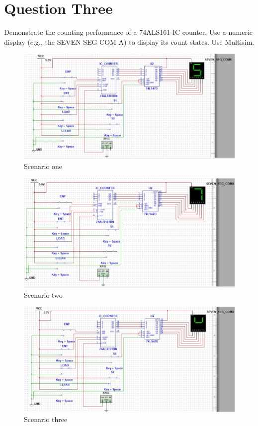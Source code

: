 \documentclass[a4paper,12]{article}
\begin{document}
\newpage
\section{Question Three}
Demonstrate the counting performance of a 74ALS161 IC counter. Use a numeric display (e.g., the SEVEN SEG COM A) to display its count states. Use Multisim.
\begin{figure}[H]
    \centering
    \includegraphics[width=\textwidth]{n31.jpg}
    \caption{Scenario one}
    \label{fig:1ae}
\end{figure}
\begin{figure}[H]
    \centering
    \includegraphics[width=\textwidth]{n32.jpg}
    \caption{Scenario two}
    \label{fig:1ae}
\end{figure}
\begin{figure}[H]
    \centering
    \includegraphics[width=\textwidth]{n33.jpg}
    \caption{Scenario three}
    \label{fig:1ae}
\end{figure}
\end{document}
